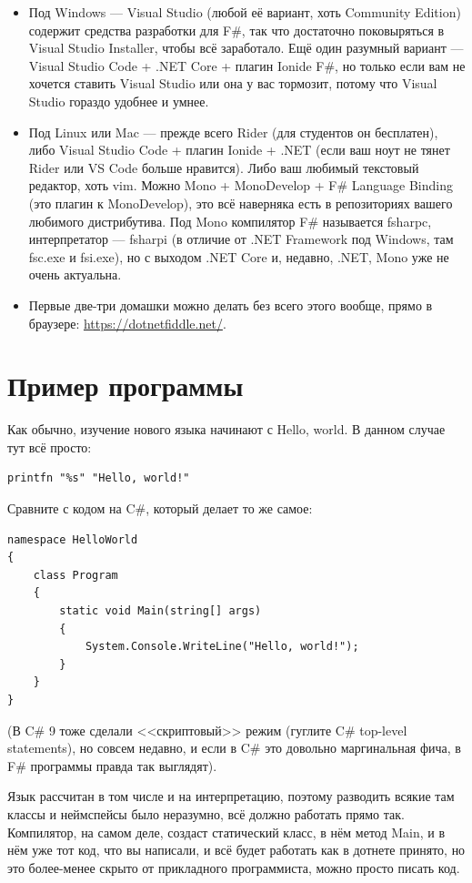 \documentclass[a5paper]{article}
\begin{document}
\begin{itemize}
    \item Под Windows --- Visual Studio (любой её вариант, хоть Community Edition) содержит средства разработки для F\#, так что достаточно поковыряться в Visual Studio Installer, чтобы всё заработало. Ещё один разумный вариант --- Visual Studio Code + .NET Core + плагин Ionide F\#, но только если вам не хочется ставить Visual Studio или она у вас тормозит, потому что Visual Studio гораздо удобнее и умнее.
    \item Под Linux или Mac --- прежде всего Rider (для студентов он бесплатен), либо Visual Studio Code + плагин Ionide + .NET (если ваш ноут не тянет Rider или VS Code больше нравится). Либо ваш любимый текстовый редактор, хоть vim. Можно Mono + MonoDevelop + F\# Language Binding (это плагин к MonoDevelop), это всё наверняка есть в репозиториях вашего любимого дистрибутива. Под Mono компилятор F\# называется fsharpc, интерпретатор --- fsharpi (в отличие от .NET Framework под Windows, там fsc.exe и fsi.exe), но с выходом .NET Core и, недавно, .NET, Mono уже не очень актуальна.
    \item Первые две-три домашки можно делать без всего этого вообще, прямо в браузере: \url{https://dotnetfiddle.net/}.
\end{itemize}

\section{Пример программы}

Как обычно, изучение нового языка начинают с Hello, world. В данном случае тут всё просто:

\begin{verbatim}
printfn "%s" "Hello, world!"
\end{verbatim}

Сравните с кодом на C\#, который делает то же самое:

\begin{verbatim}
namespace HelloWorld
{
    class Program
    {
        static void Main(string[] args)
        {
            System.Console.WriteLine("Hello, world!");
        }
    }
}
\end{verbatim}

(В C\# 9 тоже сделали <<скриптовый>> режим (гуглите C\# top-level statements), но совсем недавно, и если в C\# это довольно маргинальная фича, в F\# программы правда так выглядят).

Язык рассчитан в том числе и на интерпретацию, поэтому разводить всякие там классы и неймспейсы было неразумно, всё должно работать прямо так. Компилятор, на самом деле, создаст статический класс, в нём метод Main, и в нём уже тот код, что вы написали, и всё будет работать как в дотнете принято, но это более-менее скрыто от прикладного программиста, можно просто писать код.
\end{document}
